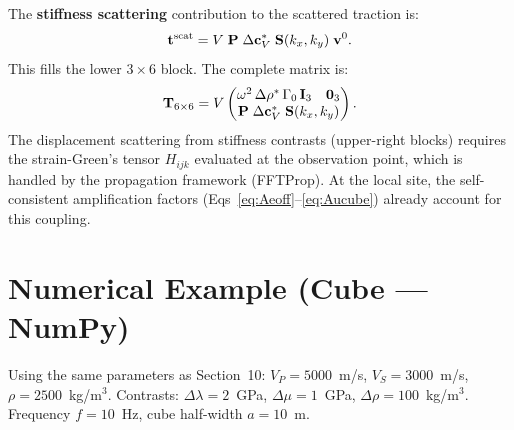 The \textbf{stiffness scattering} contribution to the scattered traction
is:
\begin{equation}
  \mathbf{t}^{\mathrm{scat}}
  = V\;\mathbf{P}\;\Delta\mathbf{c}^*_V\;\mathbf{S}(k_x,k_y)\;
    \mathbf{v}^0.
\end{equation}
This fills the lower $3\times 6$ block.  The complete matrix is:
\begin{equation}
  \bT_{6\times 6}
  = V
  \begin{pmatrix}
    \omega^2\,\Delta\rho^*\,\Gamma_0\,\bI_3 & \mathbf{0}_3 \\
    \multicolumn{2}{c}{%
      \bP\;\Delta\mathbf{c}^*_V\;\bS(k_x,k_y)
    }
  \end{pmatrix}.
\end{equation}
The displacement scattering from stiffness contrasts (upper-right blocks)
requires the strain-Green's tensor $H_{ijk}$ evaluated at the observation
point, which is handled by the propagation framework (FFTProp).  At the
local site, the self-consistent amplification factors (Eqs~\ref{eq:Aeoff}--\ref{eq:Aucube}) already
account for this coupling.


\section{Numerical Example (Cube --- NumPy)}

Using the same parameters as Section~10:
$V_P = 5000$~m/s, $V_S = 3000$~m/s, $\rho = 2500$~kg/m$^3$.
Contrasts: $\Delta\lambda = 2$~GPa, $\Delta\mu = 1$~GPa,
$\Delta\rho = 100$~kg/m$^3$.
Frequency $f = 10$~Hz, cube half-width $a = 10$~m.

